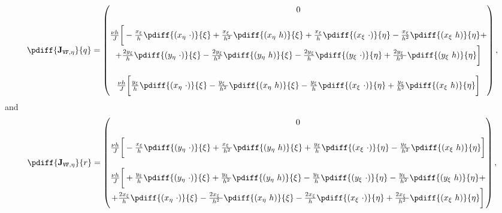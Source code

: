 {{\begin{align}
	\pdiff{\mathbf{J}_{\texttt{VF},\eta}}{q}=
		\begin{pmatrix}
	0 \\
	\\
	\frac{\nu h}{J} \bigg[
	- \frac{x_{\xi} }{h}\pdiff{(x_{\eta}\ \cdot)}{\xi}
	+ \frac{x_{\xi}\ }{h^2}\pdiff{(x_{\eta}\ h)}{\xi}
	+ \frac{x_{\xi}}{h} \pdiff{(x_{\xi}\ \cdot)}{\eta}
	- \frac{x_{\xi}}{h^2}\pdiff{(x_{\xi}\ h)}{\eta} + \\
	+ \frac{2 y_{\xi}}{h} \pdiff{(y_{\eta}\ \cdot)}{\xi}
	- \frac{2 y_{\xi}}{h^2} \pdiff{(y_{\eta}\ h)}{\xi}
	- \frac{2 y_{\xi}}{h} \pdiff{(y_{\xi}\ \cdot)}{\eta}
	+ \frac{2 y_{\xi}\ }{h^2} \pdiff{(y_{\xi}\ h)}{\eta}
	\bigg]
    \\
    \\
	\frac{\nu h}{J} \bigg[
	\frac{y_{\xi} }{h} \pdiff{(x_{\eta}\ \cdot)}{\xi}
	- \frac{y_{\xi}\ }{h^2} \pdiff{(x_{\eta}\ h)}{\xi}
	- \frac{y_{\xi}}{h} \pdiff{(x_{\xi}\ \cdot)}{\eta}
	+ \frac{y_{\xi}}{h^2} \pdiff{(x_{\xi}\ h)}{\eta}
	\bigg]
\end{pmatrix},
\end{align}
%
and
%
\begin{align}
	\pdiff{\mathbf{J}_{\texttt{VF},\eta}}{r}=
		\begin{pmatrix}
	0 \\
	\\
	\frac{\nu h}{J} \bigg[
	- \frac{x_{\xi}}{h} \pdiff{(y_{\eta}\ \cdot)}{\xi}
	+ \frac{x_{\xi}\ }{h^2}\pdiff{(y_{\eta}\ h)}{\xi}
	+ \frac{y_{\xi}}{h} \pdiff{(x_{\xi}\ \cdot)}{\eta}
	- \frac{y_{\xi}\ }{h^2} \pdiff{(x_{\xi}\ h)}{\eta}
	\bigg]
    \\
    \\
	\frac{\nu h}{J} \bigg[
	+ \frac{y_{\xi} }{h} \pdiff{(y_{\eta}\ \cdot)}{\xi}
	+ \frac{y_{\xi}\ }{h^2} \pdiff{(y_{\eta}\ h)}{\xi}
	- \frac{y_{\xi}}{h} \pdiff{(y_{\xi}\ \cdot)}{\eta}
	- \frac{y_{\xi}\ }{h^2} \pdiff{(y_{\xi}\ h)}{\eta}  + \\
	+ \frac{2 x_{\xi}}{h} \pdiff{(x_{\eta}\ \cdot)}{\xi}
	- \frac{2 x_{\xi}\ }{h^2} \pdiff{(x_{\eta}\ h)}{\xi}
	- \frac{2 x_{\xi}}{h} \pdiff{(x_{\xi}\ \cdot)}{\eta}
	+ \frac{2 x_{\xi}\ }{h^2} \pdiff{(x_{\xi}\ h)}{\eta}
	\bigg]
\end{pmatrix},
\end{align}

}}
